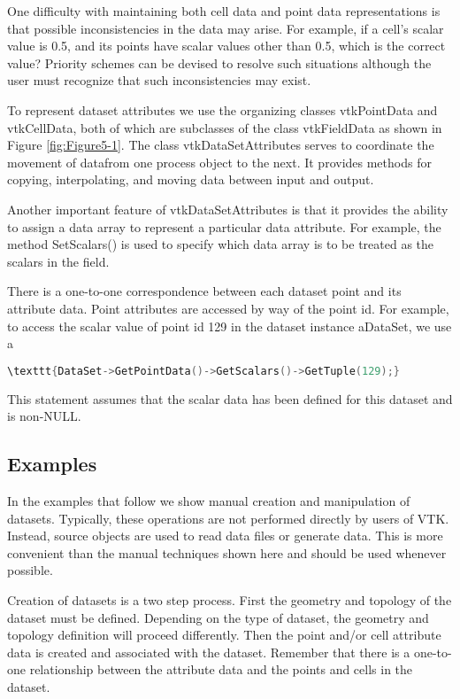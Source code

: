 One difficulty with maintaining both cell data and point data representations is that possible inconsistencies in the data may arise. For example, if a cell's scalar value is 0.5, and its points have scalar values other than 0.5, which is the correct value? Priority schemes can be devised to resolve such situations although the user must recognize that such inconsistencies may exist.

To represent dataset attributes we use the organizing classes vtkPointData and vtkCellData, both of which are subclasses of the class vtkFieldData as shown in Figure \ref{fig:Figure5-1}. The class vtkDataSetAttributes serves to coordinate the movement of datafrom one process object to the next. It provides methods for copying, interpolating, and moving data between input and output.

Another important feature of vtkDataSetAttributes is that it provides the ability to assign a data array to represent a particular data attribute. For example, the method SetScalars() is used to specify which data array is to be treated as the scalars in the field.

There is a one-to-one correspondence between each dataset point and its attribute data. Point attributes are accessed by way of the point id. For example, to access the scalar value of point id 129 in the dataset instance aDataSet, we use a

\begin{lstlisting}[language=C++,  caption={}, numbers=none, frame=none]
\texttt{DataSet->GetPointData()->GetScalars()->GetTuple(129);}
\end{lstlisting}

This statement assumes that the scalar data has been defined for this dataset and is non-NULL.

\subsection{Examples}

In the examples that follow we show manual creation and manipulation of datasets. Typically, these operations are not performed directly by users of VTK. Instead, source objects are used to read data files or generate data. This is more convenient than the manual techniques shown here and should be used whenever possible.

Creation of datasets is a two step process. First the geometry and topology of the dataset must be defined. Depending on the type of dataset, the geometry and topology definition will proceed differently. Then the point and/or cell attribute data is created and associated with the dataset. Remember that there is a one-to-one relationship between the attribute data and the points and cells in the dataset.



